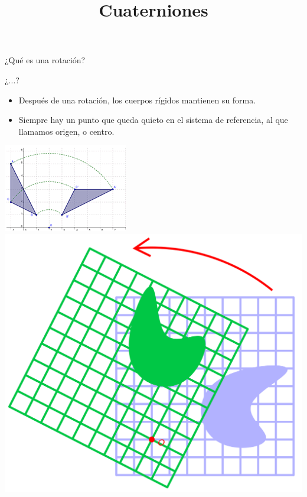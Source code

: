 \documentclass[10pt]{beamer}
\title{Cuaterniones}
\begin{document}
\maketitle


\begin{frame}{¿Qué es una rotación?}


¿...?


\pause

\begin{itemize}
	\item Después de una rotación, los cuerpos rígidos mantienen su forma. %
	\item Siempre hay un punto que queda quieto en el sistema de referencia, al que llamamos origen, o centro.
\end{itemize}



\includegraphics[scale=0.8]{rigid.png}
\includegraphics[scale=0.11]{fixed.png}

\end{frame}
\end{document}
